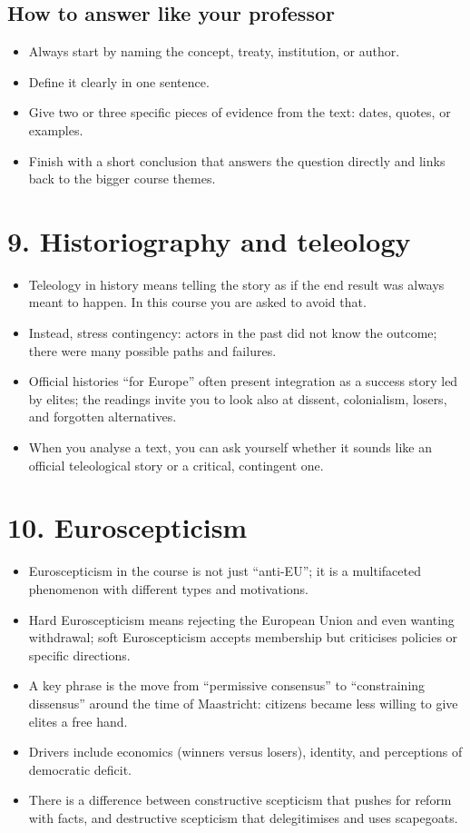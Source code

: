 \documentclass[10pt,a4paper]{article}
\begin{document}
\subsection*{How to answer like your professor}
\begin{itemize}
\item Always start by naming the concept, treaty, institution, or author.
\item Define it clearly in one sentence.
\item Give two or three specific pieces of evidence from the text: dates, quotes, or examples.
\item Finish with a short conclusion that answers the question directly and links back to the bigger course themes.
\end{itemize}

\section*{9. Historiography and teleology}
\begin{itemize}
\item Teleology in history means telling the story as if the end result was always meant to happen. In this course you are asked to avoid that.
\item Instead, stress contingency: actors in the past did not know the outcome; there were many possible paths and failures.
\item Official histories “for Europe” often present integration as a success story led by elites; the readings invite you to look also at dissent, colonialism, losers, and forgotten alternatives.
\item When you analyse a text, you can ask yourself whether it sounds like an official teleological story or a critical, contingent one.
\end{itemize}

\section*{10. Euroscepticism}
\begin{itemize}
\item Euroscepticism in the course is not just “anti-EU”; it is a multifaceted phenomenon with different types and motivations.
\item Hard Euroscepticism means rejecting the European Union and even wanting withdrawal; soft Euroscepticism accepts membership but criticises policies or specific directions.
\item A key phrase is the move from “permissive consensus” to “constraining dissensus” around the time of Maastricht: citizens became less willing to give elites a free hand.
\item Drivers include economics (winners versus losers), identity, and perceptions of democratic deficit.
\item There is a difference between constructive scepticism that pushes for reform with facts, and destructive scepticism that delegitimises and uses scapegoats.
\end{itemize}
\end{document}
